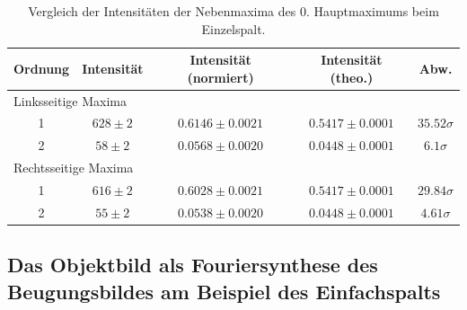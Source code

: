 \begin{table}[H]
  \centering
  \caption{Vergleich der Intensitäten der Nebenmaxima des 0. Hauptmaximums beim Einzelspalt.}
  \vspace*{0.5em}
  \begin{tabular}{|c|c|c|c|c|}\hline
    Ordnung & Intensität & Intensität (normiert) & Intensität (theo.) & Abw.\\\hline
    \multicolumn{5}{|l|}{Linksseitige Maxima}\\\hline
    1 & $628 \pm 2$   & $0.6146 \pm 0.0021$    &  $0.5417 \pm 0.0001$     &   $35.52\sigma$\\
    2 & $58 \pm 2$    & $0.0568 \pm 0.0020$    &  $0.0448 \pm 0.0001$     &   $6.1\sigma$\\\hline
    \multicolumn{5}{|l|}{Rechtsseitige Maxima}\\\hline
    1 & $616 \pm 2$  &  $0.6028 \pm 0.0021$    &  $0.5417 \pm 0.0001$   &     $29.84\sigma$\\
    2 & $55 \pm 2$   &  $0.0538 \pm 0.0020$    &  $0.0448 \pm 0.0001$   &     $4.61\sigma$\\\hline
  \end{tabular}
  \label{tab:es_vergleich_intensitaet}
\end{table}




\newpage
\subsection{Das Objektbild als Fouriersynthese des Beugungsbildes am Beispiel des Einfachspalts}